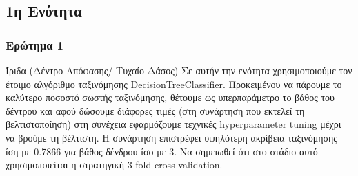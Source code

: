 \documentclass{beamer}
\begin{document}
\subsection{1η Ενότητα}
\subsubsection{Ερώτημα 1}
\begin{frame}{Ίριδα (Δέντρο Απόφασης/ Τυχαίο Δάσος)}
    Σε αυτήν την ενότητα χρησιμοποιούμε τον έτοιμο αλγόριθμο ταξινόμησης DecisionTreeClassifier. Προκειμένου να πάρουμε το καλύτερο ποσοστό σωστής ταξινόμησης, θέτουμε ως υπερπαράμετρο το βάθος του δέντρου και αφού δώσουμε διάφορες τιμές (στη συνάρτηση που εκτελεί τη βελτιστοποίηση) στη συνέχεια εφαρμόζουμε τεχνικές  hyperparameter tuning μέχρι να βρούμε τη βέλτιστη. Η συνάρτηση επιστρέφει υψηλότερη ακρίβεια ταξινόμησης ίση με 0.7866 για βάθος δένδρου ίσο με 3. Να σημειωθεί ότι στο στάδιο αυτό χρησιμοποιείται η στρατηγική  3-fold cross validation.
\end{frame}
\end{document}
